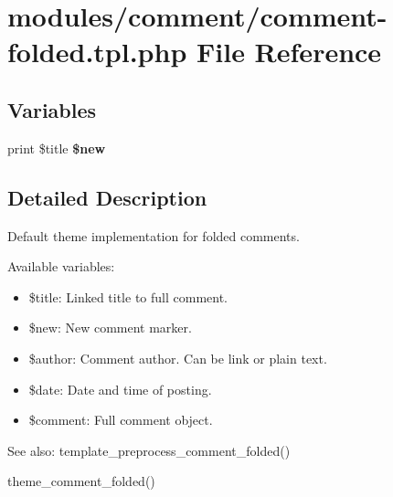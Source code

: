 \hypertarget{comment-folded_8tpl_8php}{
\section{modules/comment/comment-folded.tpl.php File Reference}
\label{comment-folded_8tpl_8php}
}
\subsection*{Variables}
\begin{CompactItemize}
\item 
\hypertarget{comment-folded_8tpl_8php_e16f8ba6954cde340efb6be38ed2a000}{
print \$title \textbf{\$new}}
\label{comment-folded_8tpl_8php_e16f8ba6954cde340efb6be38ed2a000}

\end{CompactItemize}


\subsection{Detailed Description}
Default theme implementation for folded comments.

Available variables:\begin{itemize}
\item \$title: Linked title to full comment.\item \$new: New comment marker.\item \$author: Comment author. Can be link or plain text.\item \$date: Date and time of posting.\item \$comment: Full comment object.\end{itemize}


\begin{Desc}
\item[See also:]template\_\-preprocess\_\-comment\_\-folded() 

theme\_\-comment\_\-folded() \end{Desc}
